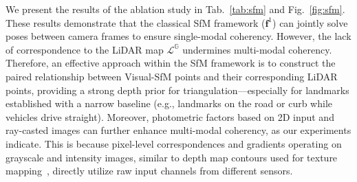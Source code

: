 We present the results of the ablation study in Tab.~\ref{tab:sfm} and Fig.~\ref{fig:sfm}. These results demonstrate that the classical SfM framework ($\mathbf{f}^1$) can jointly solve poses between camera frames to ensure single-modal coherency. However, the lack of correspondence to the LiDAR map $\mathcal{L}^\mathbb{G}$ undermines multi-modal coherency. Therefore, an effective approach within the SfM framework is to construct the paired relationship between Visual-SfM points and their corresponding LiDAR points, providing a strong depth prior for triangulation—especially for landmarks established with a narrow baseline (e.g., landmarks on the road or curb while vehicles drive straight). Moreover, photometric factors based on 2D input and ray-casted images can further enhance multi-modal coherency, as our experiments indicate. This is because pixel-level correspondences and gradients operating on grayscale and intensity images, similar to depth map contours used for texture mapping~\cite{zhou2014colormapopt}, directly utilize raw input channels from different sensors.

